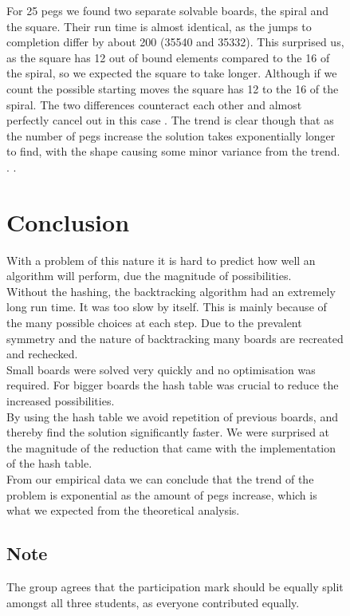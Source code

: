 \documentclass[11pt]{article}
\begin{document}
\newpage
\begin{figure}
For 25 pegs we found two separate solvable boards, the spiral and the square. Their run time is almost identical, as the jumps to completion differ by about 200 (35540 and 35332). This surprised us, as the square has 12 out of bound elements compared to the 16 of the spiral, so we expected the square to take longer. Although if we count the possible starting moves the square has 12 to the 16 of the spiral. The two differences counteract each other and almost perfectly cancel out in this case
\newline.
\newline
The trend is clear though that as the number of pegs increase the solution takes exponentially longer to find, with the shape causing some minor variance from the trend.
\newline.
\newline
\newline.
\newline
\section{Conclusion}
With a problem of this nature it is hard to predict how well an algorithm will perform, due the magnitude of possibilities. 
\\
Without the hashing, the backtracking algorithm had an extremely long run time. It was too slow by itself. This is mainly because of the many possible choices at each step. Due to the prevalent symmetry and the nature of backtracking many boards are recreated and rechecked. 
\\
Small boards were solved very quickly and no optimisation was required. For bigger boards the hash table was crucial to reduce the increased possibilities.\\
By using the hash table we avoid repetition of previous boards, and thereby find the solution significantly faster. We were surprised at the magnitude of the reduction that came with the implementation of the hash table.
\\
From our empirical data we can conclude that the trend of the problem is exponential as the amount of pegs increase, which is what we expected from the theoretical analysis. 

\subsection{Note}
The group agrees that the participation mark should be equally split amongst all three students, as everyone contributed equally.

\end{figure}

\newpage
\begin{figure}



\end{figure}
\end{document}
